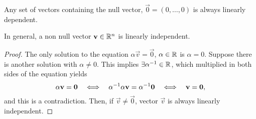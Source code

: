 \begin{prop}
    Any set of vectors containing the null vector, $\vec{0} = \left( 0, \ldots, 0 \right) $ is always
    linearly dependent.
\end{prop}

\begin{prop}
    In general, a non null vector $\mathbf{v}\in\mathbb{R}^n$ is linearly independent.
\end{prop}

\begin{proof}
The only solution to the equation $\alpha\vec{v} = \vec{0}$, $\alpha\in\mathbb{R}$ is $\alpha = 0$.
Suppose there is another solution with $\alpha\neq 0$. This implies $\exists \alpha ^{-1}\in\mathbb{R}$, which
multiplied in both sides of the equation yields
\begin{equation}
    \alpha\mathbf{v} = \mathbf{0}\quad \Longleftrightarrow\quad \alpha ^{-1}\alpha\mathbf{v} = \alpha ^{-1}\mathbf{0} \quad
        \Longleftrightarrow\quad \mathbf{v} = \mathbf{0},
\end{equation}
and this is a contradiction. Then, if $\vec{v}\neq \vec{0}$, vector $\vec{v}$ is always linearly independent.
\end{proof}


